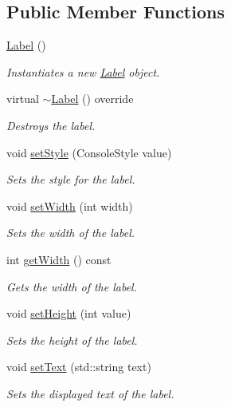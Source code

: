 \subsection*{Public Member Functions}
\begin{DoxyCompactItemize}
\item 
\mbox{\hyperlink{class_label_af8f2bccf9faadcb2ca964bd2347dde24}{Label}} ()
\begin{DoxyCompactList}\small\item\em Instantiates a new \mbox{\hyperlink{class_label}{Label}} object. \end{DoxyCompactList}\item 
virtual \mbox{\hyperlink{class_label_a21f4dd9aa297a03f641dd689ea291e2b}{$\sim$\+Label}} () override
\begin{DoxyCompactList}\small\item\em Destroys the label. \end{DoxyCompactList}\item 
void \mbox{\hyperlink{class_label_a8b4c56829c676960e9bb9000eaa83963}{set\+Style}} (Console\+Style value)
\begin{DoxyCompactList}\small\item\em Sets the style for the label. \end{DoxyCompactList}\item 
void \mbox{\hyperlink{class_label_a11354abcef74d29dca59ee029521d04b}{set\+Width}} (int width)
\begin{DoxyCompactList}\small\item\em Sets the width of the label. \end{DoxyCompactList}\item 
int \mbox{\hyperlink{class_label_a81c445ff99fbdfa3ca662783568adda8}{get\+Width}} () const
\begin{DoxyCompactList}\small\item\em Gets the width of the label. \end{DoxyCompactList}\item 
void \mbox{\hyperlink{class_label_ac97689cc2fa667ef92da9904b1679fd5}{set\+Height}} (int value)
\begin{DoxyCompactList}\small\item\em Sets the height of the label. \end{DoxyCompactList}\item 
void \mbox{\hyperlink{class_label_a6bc9eefce325e64edb7d1aca939093fb}{set\+Text}} (std\+::string text)
\begin{DoxyCompactList}\small\item\em Sets the displayed text of the label. \end{DoxyCompactList}\item 

\end{DoxyCompactItemize}
